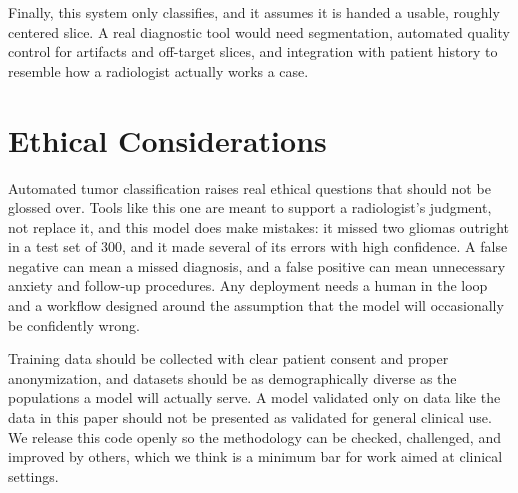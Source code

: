 \documentclass[twocolumn]{article}
\begin{document}
Finally, this system only classifies, and it assumes it is handed a usable, roughly centered slice. A real diagnostic tool would need segmentation, automated quality control for artifacts and off-target slices, and integration with patient history to resemble how a radiologist actually works a case.

\section{Ethical Considerations}
Automated tumor classification raises real ethical questions that should not be glossed over. Tools like this one are meant to support a radiologist's judgment, not replace it, and this model does make mistakes: it missed two gliomas outright in a test set of 300, and it made several of its errors with high confidence. A false negative can mean a missed diagnosis, and a false positive can mean unnecessary anxiety and follow-up procedures. Any deployment needs a human in the loop and a workflow designed around the assumption that the model will occasionally be confidently wrong.

Training data should be collected with clear patient consent and proper anonymization, and datasets should be as demographically diverse as the populations a model will actually serve. A model validated only on data like the data in this paper should not be presented as validated for general clinical use. We release this code openly so the methodology can be checked, challenged, and improved by others, which we think is a minimum bar for work aimed at clinical settings.
\end{document}
